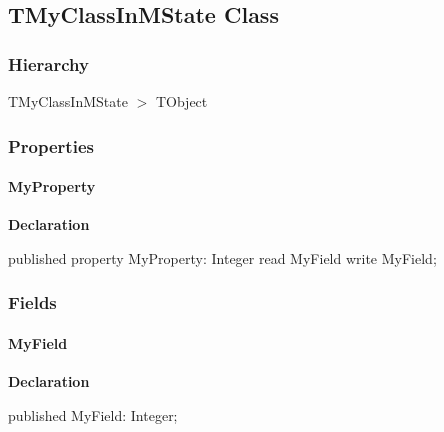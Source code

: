 \documentclass{report}
\begin{document}
\subsection*{TMyClassInMState Class}
\subsubsection*{\large{\textbf{Hierarchy}}\normalsize\hspace{1ex}\hfill}
TMyClassInMState {$>$} TObject
\subsubsection*{\large{\textbf{Properties}}\normalsize\hspace{1ex}\hfill}
\paragraph*{MyProperty}\hspace*{\fill}

\begin{list}{}{
\setlength{\itemindent}{0cm}
\setlength{\listparindent}{0cm}
\setlength{\leftmargin}{\evensidemargin}
\addtolength{\leftmargin}{\tmplength}
\settowidth{\labelsep}{X}
\addtolength{\leftmargin}{\labelsep}
\setlength{\labelwidth}{\tmplength}
}
\begin{flushleft}
\item[\textbf{Declaration}\hfill]
\begin{ttfamily}
published property MyProperty: Integer read MyField write MyField;\end{ttfamily}


\end{flushleft}
\end{list}
\subsubsection*{\large{\textbf{Fields}}\normalsize\hspace{1ex}\hfill}
\paragraph*{MyField}\hspace*{\fill}

\begin{list}{}{
\setlength{\itemindent}{0cm}
\setlength{\listparindent}{0cm}
\setlength{\leftmargin}{\evensidemargin}
\addtolength{\leftmargin}{\tmplength}
\settowidth{\labelsep}{X}
\addtolength{\leftmargin}{\labelsep}
\setlength{\labelwidth}{\tmplength}
}
\begin{flushleft}
\item[\textbf{Declaration}\hfill]
\begin{ttfamily}
published MyField: Integer;\end{ttfamily}


\end{flushleft}
\end{list}
\end{document}
